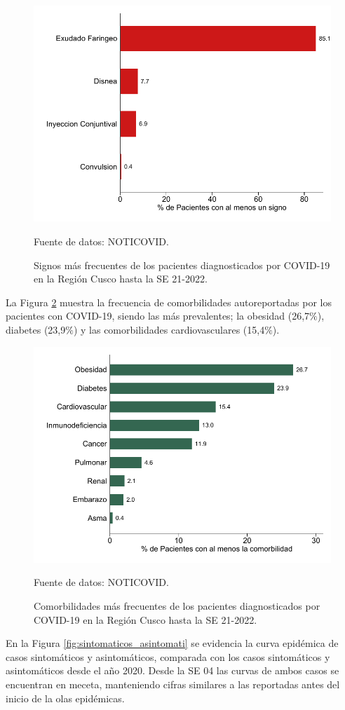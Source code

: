 \documentclass[12pt,a4paper,openany]{book}
\begin{document}
	\begin{figure}[h]
		\caption{Signos más frecuentes de los pacientes diagnosticados por COVID-19 en la Región Cusco hasta la SE 21-2022.}\label{fig:signos}
		\begin{center}
			\includegraphics[width=0.65\linewidth]{../figuras/figura_signo.pdf}
		\end{center}
		{\footnotesize {Fuente de datos: NOTICOVID.}}
	\end{figure}
	
	La Figura \ref{fig:comorbilidades} muestra la frecuencia de comorbilidades autoreportadas por los pacientes con COVID-19, siendo las más prevalentes; la obesidad (26,7$\%$), diabetes (23,9$\%$) y las comorbilidades cardiovasculares (15,4$\%$).  
	\begin{figure}[h]
		\caption{Comorbilidades más frecuentes de los pacientes diagnosticados por COVID-19 en la Región Cusco hasta la SE 21-2022. }\label{fig:comorbilidades}
		\begin{center}
			\includegraphics[width=0.65\linewidth]{../figuras/figura_comorbilidad.pdf}
		\end{center}
		{\footnotesize {Fuente de datos: NOTICOVID.}}
	\end{figure}
	\clearpage
	En la Figura \ref{fig:sintomaticos_asintomati} se evidencia la curva epidémica de casos sintomáticos y asintomáticos, comparada con los casos sintomáticos y asintomáticos desde el año 2020. Desde la SE 04 las curvas de ambos casos se encuentran en meceta, manteniendo cifras similares a las reportadas antes del inicio de la olas epidémicas. 
	
\end{document}
